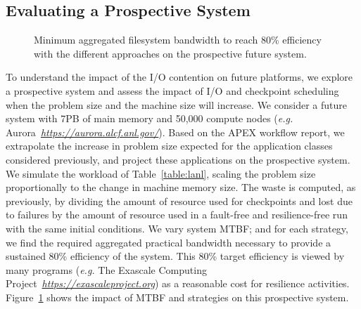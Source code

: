 \documentclass[conference,nofonttune]{IEEEtran}
\newcommand{\eg}[0]{\emph{e.g.}\xspace}
\newcommand{\fifononblock}{\emph{Ordered-NB}\xspace}
\def\fifofixed{\fifononblock-Fixed\xspace}
\begin{document}

\subsection{Evaluating a Prospective System}

\begin{figure}
  \begin{center}
    \resizebox{1.05\linewidth}{!}{}
  \end{center}
  \caption{Minimum aggregated filesystem bandwidth to reach 80\%
    efficiency with the different approaches on the prospective
    future system.\label{fig:prosp}}
\end{figure}

To understand the impact of the I/O contention on future platforms, we
explore a prospective system and assess the impact of I/O
and checkpoint scheduling when the problem size and the machine size will
increase. We consider a future system with 7PB of main memory and 50,000
compute nodes (\eg Aurora~\textit{\url{https://aurora.alcf.anl.gov/}}). Based
on the APEX workflow report, we extrapolate the increase in problem size
expected for the application classes considered previously, and project these
applications on the prospective system.  We simulate the workload of
Table~\ref{table:lanl}, scaling the problem size proportionally to the change
in machine memory size. The waste is computed, as previously, by dividing the
amount of resource used for checkpoints and lost due to failures by the amount
of resource used in a fault-free and resilience-free run with the same initial
conditions.
%
We vary system MTBF; and for each strategy, we find the required aggregated
practical bandwidth necessary to provide a sustained 80\% efficiency of the
system.  This 80\% target efficiency is viewed by many programs (\eg
The Exascale Computing Project~\textit{\url{https://exascaleproject.org}}) as a
reasonable cost for resilience activities.
%
Figure~\ref{fig:prosp} shows the impact of MTBF and strategies on this
prospective system.
\end{document}
